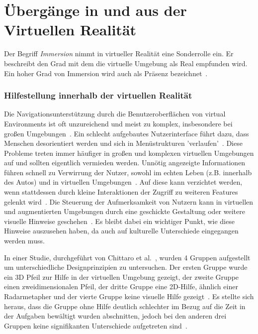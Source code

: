 \section{Übergänge in und aus der Virtuellen Realität}\label{sec:relatedWork.vr}

Der Begriff \textit{Immersion} nimmt in virtueller Realität eine Sonderrolle ein. Er beschreibt den Grad mit dem die virtuelle Umgebung als Real empfunden wird. Ein hoher Grad von Immersion wird auch als Präsenz bezeichnet~\cite{bowman2007virtual,knibbe2018dream}.


\subsubsection{Hilfestellung innerhalb der virtuellen Realität}

Die Navigationsunterstützung durch die Benutzeroberflächen von virtual Environments ist oft unzureichend und meist zu komplex, insbesondere bei großen Umgebungen~\cite{chittaro20043d}. 
Ein schlecht aufgebautes Nutzerinterface führt dazu, dass Menschen desorientiert werden und sich in Menüstrukturen 'verlaufen'~\cite{chittaro20043d,bonanni2005attention}. 
Diese Probleme treten immer häufiger in großen und komplexen virtuellen Umgebungen auf und sollten eigentlich vermieden werden. 
Unnötig angezeigte Informationen führen schnell zu Verwirrung der Nutzer, sowohl im echten Leben (z.B. innerhalb des Autos) und in virtuellen Umgebungen~\cite{chittaro20043d}. 
Auf diese kann verzichtet werden, wenn stattdessen durch kleine Interaktionen der Zugriff zu weiteren Features gelenkt wird~\cite{chittaro20043d}. Die Steuerung der Aufmerksamkeit von Nutzern kann in virtuellen und augmentierten Umgebungen durch eine geschickte Gestaltung oder weitere visuelle Hinweise geschehen~\cite{bonanni2005attention}. Es bleibt dabei ein wichtiger Punkt, wie diese Hinweise auszusehen haben, da auch auf kulturelle Unterschiede eingegangen werden muss. 

In einer Studie, durchgeführt von Chittaro et al.~\cite{chittaro20043d}, wurden 4 Gruppen aufgestellt um unterschiedliche Designprinzipien zu untersuchen. 
Der ersten Gruppe wurde ein 3D Pfeil zur Hilfe in der virtuellen Umgebung gezeigt, der zweite Gruppe einen zweidimensionalen Pfeil, der dritte Gruppe eine 2D-Hilfe, ähnlich einer Radarmetapher und der vierte Gruppe keine visuelle Hilfe gezeigt~\cite{chittaro20043d}. 
Es stellte sich heraus, dass die Gruppe ohne Hilfe deutlich schlechter im Bezug auf die Zeit in der Aufgaben bewältigt wurden abschnitten, jedoch bei den anderen drei Gruppen keine signifikanten Unterschiede aufgetreten sind~\cite{chittaro20043d}.

